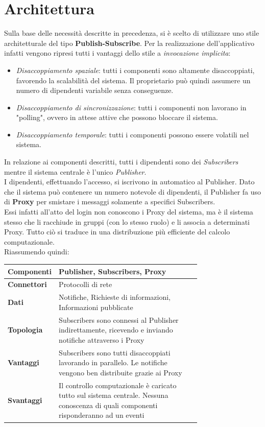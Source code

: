 \section{Architettura}
Sulla base delle necessità descritte in precedenza, si è scelto di utilizzare uno stile architetturale del tipo \textbf{Publish-Subscribe}. Per la realizzazione dell'applicativo infatti vengono ripresi tutti i vantaggi dello stile a \textit{invocazione implicita}:
\begin{itemize}
	\item \textit{Disaccoppiamento spaziale}: tutti i componenti sono altamente disaccoppiati, favorendo la scalabilità del sistema. Il proprietario può quindi assumere un numero di dipendenti variabile senza conseguenze.
	\item \textit{Disaccoppiamento di sincronizzazione}: tutti i componenti non lavorano in "polling", ovvero in attese attive che possono bloccare il sistema.
	\item \textit{Disaccoppiamento temporale}: tutti i componenti possono essere volatili nel sistema.
\end{itemize}
In relazione ai componenti descritti, tutti i dipendenti sono dei \textit{Subscribers} mentre il sistema centrale è l'unico \textit{Publisher}.
\\I dipendenti, effettuando l'accesso, si iscrivono in automatico al Publisher.
Dato che il sistema può contenere un numero notevole di dipendenti, il Publisher fa uso di \textbf{Proxy} per smistare i messaggi solamente a specifici Subscribers.
\\Essi infatti all'atto del login non conoscono i Proxy del sistema, ma è il sistema stesso che li racchiude in gruppi (con lo stesso ruolo) e li associa a determinati Proxy. Tutto ciò si traduce in una distribuzione più efficiente del calcolo computazionale.
\\Riassumendo quindi:
\begin{table}[H]
	\centering
	\begin{tabular}{|l | p{0.75\linewidth} |}
		\hline
		\textbf{Componenti} & Publisher, Subscribers, 
		Proxy \\
		\hline
		\textbf{Connettori} & Protocolli di rete \\
		\hline
		\textbf{Dati} & Notifiche, Richieste di informazioni, Informazioni pubblicate \\
		\hline
		\textbf{Topologia} & Subscribers sono connessi al Publisher indirettamente, ricevendo e inviando notifiche attraverso i Proxy \\
		\hline
		\textbf{Vantaggi} & Subscribers sono tutti disaccoppiati lavorando in parallelo. Le notifiche vengono ben distribuite grazie ai Proxy \\
		\hline
		\textbf{Svantaggi} & Il controllo computazionale è caricato tutto sul sistema centrale. Nessuna conoscenza di quali componenti risponderanno ad un eventi \\
		\hline
	\end{tabular}
\end{table}

